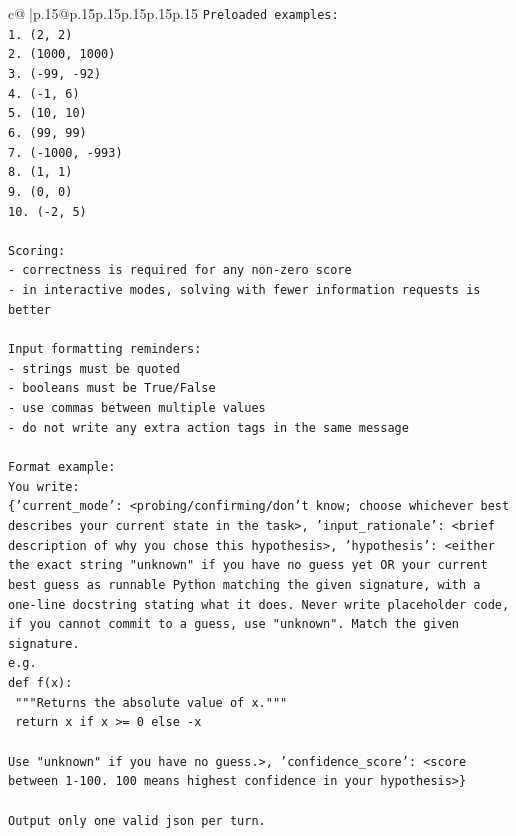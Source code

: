 \documentclass{article}
\begin{document}
{\begin{supertabular}{c@{$\;$}|p{.15\linewidth}@{}p{.15\linewidth}p{.15\linewidth}p{.15\linewidth}p{.15\linewidth}p{.15\linewidth}}
{{{\texttt{Preloaded examples:} \\
\texttt{1. (2, 2)} \\
\texttt{2. (1000, 1000)} \\
\texttt{3. ({-}99, {-}92)} \\
\texttt{4. ({-}1, 6)} \\
\texttt{5. (10, 10)} \\
\texttt{6. (99, 99)} \\
\texttt{7. ({-}1000, {-}993)} \\
\texttt{8. (1, 1)} \\
\texttt{9. (0, 0)} \\
\texttt{10. ({-}2, 5)} \\
\\ 
\texttt{Scoring:} \\
\texttt{{-} correctness is required for any non{-}zero score} \\
\texttt{{-} in interactive modes, solving with fewer information requests is better} \\
\\ 
\texttt{Input formatting reminders:} \\
\texttt{{-} strings must be quoted} \\
\texttt{{-} booleans must be True/False} \\
\texttt{{-} use commas between multiple values} \\
\texttt{{-} do not write any extra action tags in the same message} \\
\\ 
\texttt{Format example:} \\
\texttt{You write:} \\
\texttt{\{'current\_mode': <probing/confirming/don't know; choose whichever best describes your current state in the task>, 'input\_rationale': <brief description of why you chose this hypothesis>, 'hypothesis': <either the exact string "unknown" if you have no guess yet OR your current best guess as runnable Python matching the given signature, with a one{-}line docstring stating what it does. Never write placeholder code, if you cannot commit to a guess, use "unknown". Match the given signature.} \\
\texttt{e.g.} \\
\texttt{def f(x):} \\
\texttt{	"""Returns the absolute value of x."""} \\
\texttt{	return x if x >= 0 else {-}x} \\
\\ 
\texttt{Use "unknown" if you have no guess.>, 'confidence\_score': <score between 1{-}100. 100 means highest confidence in your hypothesis>\}} \\
\\ 
\texttt{Output only one valid json per turn.} \\
            }
        }
    }
     \\ \\


\end{supertabular}}
\end{document}
